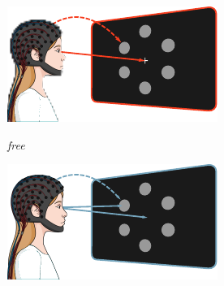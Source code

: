 \documentclass{kul-ulille-beamer}
\begin{document}
\begin{frame}
\begin{minipage}{.6\textwidth}
{\begin{minipage}{.3\textwidth}
      \includegraphics[width=\textwidth]{figures/covert/attention_covert.pdf}
    \end{minipage}\hfill%
    \begin{minipage}{.3\textwidth}
      \small
      \emph{free}
      \smallskip

      \includegraphics[width=\textwidth]{figures/covert/attention_free.pdf}
    \end{minipage}%
  }
  \end{minipage}



\end{frame}
\end{document}
